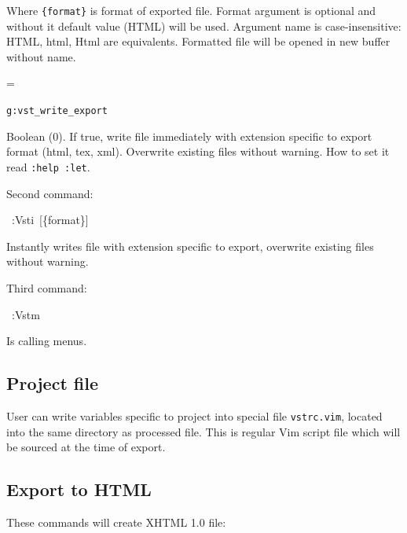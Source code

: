 \documentclass[12pt]{article}
\newenvironment{deflist}[1]{%
\begin{list}{}
{\renewcommand{\makelabel}[1]{\textbf{##1}\hfill}
\settowidth{\labelwidth}{\textbf{#1}}
\leftmargin=\labelwidth
\advance \leftmargin\labelsep}}
{\end{list}}
\begin{document}
Where \texttt{\{format\}} is format of exported file. Format argument is
optional and without it default value (HTML) will be used. Argument name
is case-insensitive: HTML, html, Html are equivalents. Formatted file
will be opened in new buffer without name.

\begin{deflist}{iii}

\item[\texttt{g:vst\_write\_export}]

Boolean (0). If true, write file immediately with extension specific to
export format (html, tex, xml). Overwrite existing files without warning.
How to set it read \texttt{:help :let}.
\end{deflist}

Second command:

\begin{ttfamily}\begin{flushleft}
\mbox{~:Vsti~[\{format\}]}\\
\end{flushleft}\end{ttfamily}

Instantly writes file with extension specific to export, overwrite existing
files without warning.

Third command:

\begin{ttfamily}\begin{flushleft}
\mbox{~:Vstm}\\
\end{flushleft}\end{ttfamily}

Is calling menus.

\hypertarget{lproject-file}{}
\subsection{Project file}

User can write variables specific to project into special file \texttt{vstrc.vim},
located into the same directory as processed file. This is regular Vim script
file which will be sourced at the time of export.

\hypertarget{lexport-to-html}{}
\subsection{Export to HTML}

These commands will create XHTML 1.0 file:
\end{document}
